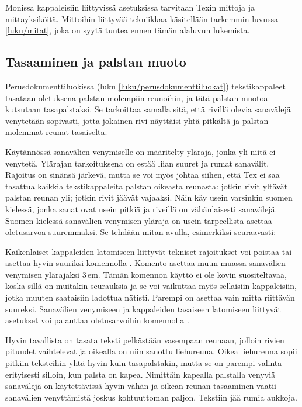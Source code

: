 Monissa kappaleisiin liittyvissä asetuksissa tarvitaan Texin mittoja ja
mittayksiköitä. Mittoihin liittyvää tekniikkaa käsitellään tarkemmin
luvussa \ref{luku/mitat}, joka on syytä tuntea ennen tämän alaluvun
lukemista.

\subsection{Tasaaminen ja palstan muoto}
\label{luku/kappaleen-tasaus}

Perusdokumenttiluokissa (luku \ref{luku/perusdokumenttiluokat})
tekstikappaleet tasataan oletuksena palstan molempiin reunoihin, ja tätä
palstan muotoa kutsutaan tasapalstaksi. Se tarkoittaa samalla sitä, että
rivillä olevia sanavälejä venytetään sopivasti, jotta jokainen rivi
näyttäisi yhtä pitkältä ja palstan molemmat reunat tasaiselta.

Käytännössä sanavälien venymiselle on määritelty yläraja, jonka yli
niitä ei venytetä. Ylärajan tarkoituksena on estää liian suuret ja rumat
sanavälit. Rajoitus on sinänsä järkevä, mutta se voi myös johtaa siihen,
että Tex ei saa tasattua kaikkia tekstikappaleita palstan oikeasta
reunasta: jotkin rivit yltävät palstan reunan yli; jotkin rivit jäävät
vajaaksi. Näin käy usein varsinkin suomen kielessä, jonka sanat ovat
usein pitkiä ja riveillä on vähänlaisesti sanavälejä. Suomen kielessä
sanavälien venymisen yläraja on usein tarpeellista asettaa oletusarvoa
suuremmaksi. Se tehdään mitan  avulla,
esimerkiksi seuraavasti:

\begin{koodilohkosis}
\setlength{\emergencystretch}{1em}
\end{koodilohkosis}

\noindent
Kaikenlaiset kappaleiden latomiseen liittyvät tekniset rajoitukset voi
poistaa tai asettaa hyvin suuriksi komennolla . Komento
asettaa muun muassa sanavälien venymisen ylärajaksi 3\,em. Tämän
komennon käyttö ei ole kovin suositeltavaa, koska sillä on muitakin
seurauksia ja se voi vaikuttaa myös sellaisiin kappaleisiin, jotka
muuten saataisiin ladottua nätisti. Parempi on asettaa vain mitta
 riittävän suureksi. Sanavälien venymiseen ja
kappaleiden tasaiseen latomiseen liittyvät asetukset voi palauttaa
oletusarvoihin komennolla .

Hyvin tavallista on tasata teksti pelkästään vasempaan reunaan, jolloin
rivien pituudet vaihtelevat ja oikealla on niin sanottu liehureuna.
Oikea liehureuna sopii pitkiin teksteihin yhtä hyvin kuin tasapalstakin,
mutta se on parempi valinta erityisesti silloin, kun palsta on kapea.
Nimittäin kapealla palstalla venyviä sanavälejä on käytettävissä hyvin
vähän ja oikean reunan tasaaminen vaatii sanavälien venyttämistä joskus
kohtuuttoman paljon. Tekstiin jää rumia aukkoja.


